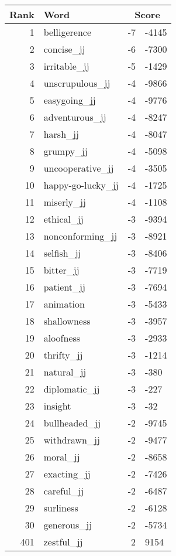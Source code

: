 \begin{longtable}[!htbp]{| rlr@{.}l |}
    \hline
    \textbf{Rank} & \textbf{Word} & \multicolumn{2}{c|}{\textbf{Score}} \\
    \hline
    \endhead
    1 & belligerence & -7 & -4145 \\
    2 & concise\_jj & -6 & -7300 \\
    3 & irritable\_jj & -5 & -1429 \\
    4 & unscrupulous\_jj & -4 & -9866 \\
    5 & easygoing\_jj & -4 & -9776 \\
    6 & adventurous\_jj & -4 & -8247 \\
    7 & harsh\_jj & -4 & -8047 \\
    8 & grumpy\_jj & -4 & -5098 \\
    9 & uncooperative\_jj & -4 & -3505 \\
    10 & happy-go-lucky\_jj & -4 & -1725 \\
    11 & miserly\_jj & -4 & -1108 \\
    12 & ethical\_jj & -3 & -9394 \\
    13 & nonconforming\_jj & -3 & -8921 \\
    14 & selfish\_jj & -3 & -8406 \\
    15 & bitter\_jj & -3 & -7719 \\
    16 & patient\_jj & -3 & -7694 \\
    17 & animation & -3 & -5433 \\
    18 & shallowness & -3 & -3957 \\
    19 & aloofness & -3 & -2933 \\
    20 & thrifty\_jj & -3 & -1214 \\
    21 & natural\_jj & -3 & -380 \\
    22 & diplomatic\_jj & -3 & -227 \\
    23 & insight & -3 & -32 \\
    24 & bullheaded\_jj & -2 & -9745 \\
    25 & withdrawn\_jj & -2 & -9477 \\
    26 & moral\_jj & -2 & -8658 \\
    27 & exacting\_jj & -2 & -7426 \\
    28 & careful\_jj & -2 & -6487 \\
    29 & surliness & -2 & -6128 \\
    30 & generous\_jj & -2 & -5734 \\
    401 & zestful\_jj & 2 & 9154 \\

\end{longtable}
